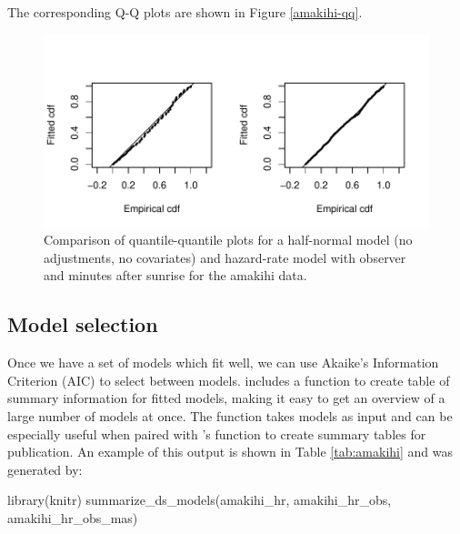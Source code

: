 \documentclass[article]{jss}
\begin{document}
The corresponding Q-Q plots are shown in Figure \ref{amakihi-qq}.

\begin{CodeChunk}
\begin{figure}

{\centering \includegraphics{paper_files/figure-latex/amakihi-qq-comp-1} 

}

\caption[Comparison of quantile-quantile plots for a half-normal model (no adjustments, no covariates) and hazard-rate model with observer and minutes after sunrise for the amakihi data]{Comparison of quantile-quantile plots for a half-normal model (no adjustments, no covariates) and hazard-rate model with observer and minutes after sunrise for the amakihi data.\label{amakihi-qq}}\label{fig:amakihi-qq-comp}
\end{figure}
\end{CodeChunk}

\subsection{Model selection}\label{model-selection}

Once we have a set of models which fit well, we can use Akaike's
Information Criterion (AIC) to select between models. 
includes a function to create table of summary information for fitted
models, making it easy to get an overview of a large number of models at
once. The  function takes models as input and
can be especially useful when paired with 's 
function to create summary tables for publication. An example of this
output is shown in Table \ref{tab:amakihi} and was generated by:

\begin{CodeChunk}
\begin{CodeInput}
library(knitr)
summarize_ds_models(amakihi_hr, amakihi_hr_obs, amakihi_hr_obs_mas)
\end{CodeInput}
\end{CodeChunk}
\end{document}
